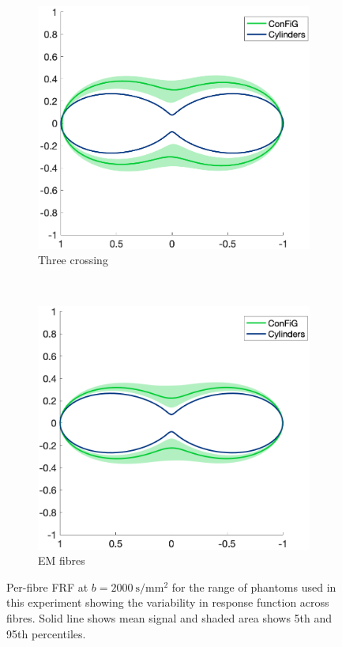 \begin{figure}[h!]
  \begin{subfigure}[]{0.4\textwidth}
    \includegraphics[width=\textwidth]{figures/frf_experiment/threeperp_prctiles_b_2000.png}
    \caption{Three crossing}
  \end{subfigure}
  ~
  \begin{subfigure}[]{0.4\textwidth}
    \includegraphics[width=\textwidth]{figures/frf_experiment/EMfibres_prctiles_b_2000.png}
    \caption{\ac{EM} fibres}
  \end{subfigure}

  \caption[Per-fibre FRF at $b=\SI{2000}{\second\per\milli\metre\squared}$]{Per-fibre FRF at $b = \SI{2000}{\second\per\milli\metre\squared}$ for the range of phantoms used in this experiment showing the variability in response function across fibres. Solid line shows mean signal and shaded area shows 5th and 95th percentiles. }
  \label{fig:frf_prctiles_kappa_b2000}
\end{figure}


